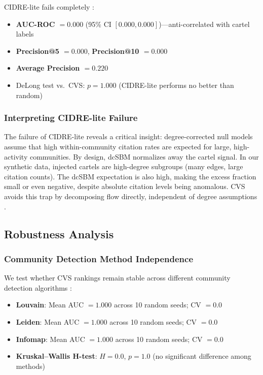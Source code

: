 \documentclass[11pt,letterpaper]{article}
\begin{document}
CIDRE-lite fails completely \citep{Priem2022, Newman2003}:
\begin{itemize}
  \item \textbf{AUC-ROC $= 0.000$} (95\% CI $[0.000, 0.000]$)---anti-correlated with cartel labels
  \item \textbf{Precision@5 $= 0.000$}, \textbf{Precision@10 $= 0.000$}
  \item \textbf{Average Precision $= 0.220$}
  \item DeLong test vs.\ CVS: $p = 1.000$ (CIDRE-lite performs no better than random)
\end{itemize}

\subsubsection*{Interpreting CIDRE-lite Failure}

The failure of CIDRE-lite reveals a critical insight: degree-corrected null models assume that high within-community citation rates are expected for large, high-activity communities. By design, dcSBM normalizes away the cartel signal. In our synthetic data, injected cartels are high-degree subgroups (many edges, large citation counts). The dcSBM expectation is also high, making the excess fraction small or even negative, despite absolute citation levels being anomalous. CVS avoids this trap by decomposing flow directly, independent of degree assumptions \citep{Priem2022, Newman2003}.

\subsection{Robustness Analysis}

\subsubsection*{Community Detection Method Independence}

We test whether CVS rankings remain stable across different community detection algorithms \citep{Newman2003}:
\begin{itemize}
  \item \textbf{Louvain}: Mean AUC $= 1.000$ across 10 random seeds; CV $= 0.0$
  \item \textbf{Leiden}: Mean AUC $= 1.000$ across 10 random seeds; CV $= 0.0$
  \item \textbf{Infomap}: Mean AUC $= 1.000$ across 10 random seeds; CV $= 0.0$
  \item \textbf{Kruskal--Wallis H-test}: $H = 0.0$, $p = 1.0$ (no significant difference among methods)
\end{itemize}
\end{document}
